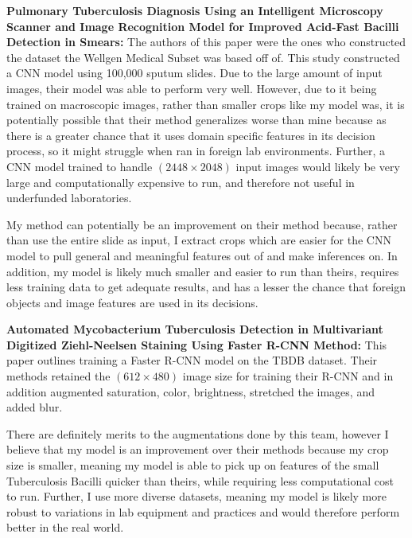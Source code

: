 \documentclass{article}
\begin{document}
\textbf{Pulmonary Tuberculosis Diagnosis Using an Intelligent Microscopy Scanner and Image Recognition Model for Improved Acid-Fast Bacilli Detection in Smears:}
The authors of this paper were the ones who constructed the dataset the Wellgen Medical Subset was based off of\cite{chen2024pulmonary}. This study
constructed a CNN model using 100,000 sputum slides. Due to the large amount of input images, their model was able to perform
very well. However, due to it being trained on macroscopic images, rather than smaller crops like my model was, it is potentially possible that
their method generalizes worse than mine because as there is a greater chance that it uses domain specific features in its decision process, so
it might struggle when ran in foreign lab environments. Further, a CNN model trained to handle $(2448 \times 2048)$ input images would likely be
very large and computationally expensive to run, and therefore not useful in underfunded laboratories.

My method can potentially be an improvement on their method because, rather than use the entire slide as input, I extract crops which 
are easier for the CNN model to pull general and meaningful features out of and make inferences on. In addition, my model is likely much smaller
and easier to run than theirs, requires less training data to get adequate results,
and has a lesser the chance that foreign objects and image features are used in its decisions.




\textbf{Automated Mycobacterium Tuberculosis Detection in Multivariant Digitized Ziehl-Neelsen Staining Using Faster R-CNN Method:}
This paper outlines training a Faster R-CNN model on the TBDB\cite{TBDB} dataset. Their methods retained the $(612 \times 480)$
image size for training their R-CNN and in addition augmented saturation, color, brightness, stretched the images, and added blur. 

There are definitely merits to the augmentations done by this team, however I believe that my model is an improvement over their methods
because my crop size is smaller, meaning my model is able to pick up on features of the small Tuberculosis Bacilli quicker than theirs, while
requiring less computational cost to run. Further, I use more diverse datasets, meaning my model is likely more robust to variations 
in lab equipment and practices and would therefore perform better in the real world.
\end{document}
